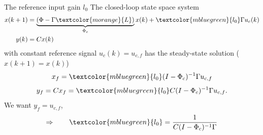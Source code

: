 \documentclass[presentation,aspectratio=1610]{beamer}
\begin{document}
\begin{frame}[label={sec:org41f1c99}]{The reference input gain \(l_0\)}
The closed-loop state space system
\begin{equation*}
\begin{split}
 x(k+1) &= \underbrace{\left(\Phi -\Gamma \textcolor{morange}{L} \right)}_{\Phi_c} x(k) + \textcolor{mbluegreen}{l_0}\Gamma u_c(k)\\
 y(k) &= C x(k)
\end{split}
\end{equation*}
with constant reference signal \(u_c(k) = u_{c,f}\) has the steady-state solution (\(x(k+1)=x(k)\))
\pause
\[ x_f =  \textcolor{mbluegreen}{l_0} (I - \Phi_c)^{-1}\Gamma u_{c,f}\]
\[ y_f = Cx_f = \textcolor{mbluegreen}{l_0} C(I - \Phi_c)^{-1}\Gamma u_{c,f}.\]
We want \(y_f =  u_{c,f}\),
\[ \Rightarrow \qquad \textcolor{mbluegreen}{l_0} = \frac{1}{C(I-\Phi_c)^{-1}\Gamma}\]
\end{frame}
\end{document}
